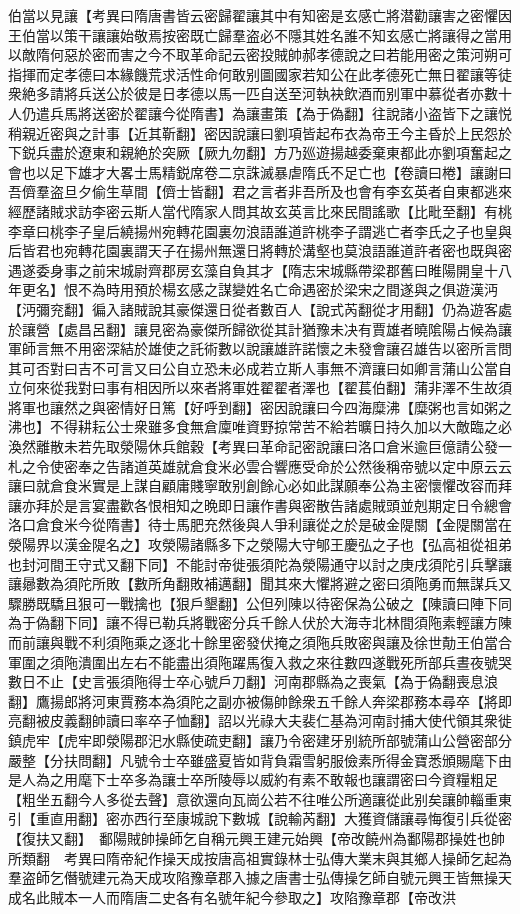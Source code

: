 伯當以見讓【考異曰隋唐書皆云密歸翟讓其中有知密是玄感亡將潜勸讓害之密懼因王伯當以策干讓讓始敬焉按密既亡歸羣盗必不隱其姓名誰不知玄感亡將讓得之當用以敵隋何惡於密而害之今不取革命記云密投賊帥郝孝德說之曰若能用密之策河朔可指揮而定孝德曰本緣饑荒求活性命何敢别圖國家若知公在此孝德死亡無日翟讓等徒衆絶多請將兵送公於彼是日孝德以馬一匹自送至河執袂飲酒而别軍中慕從者亦數十人仍遣兵馬將送密於翟讓今從隋書】為讓畫策【為于偽翻】往說諸小盗皆下之讓悦稍親近密與之計事【近其靳翻】密因說讓曰劉項皆起布衣為帝王今主昏於上民怨於下鋭兵盡於遼東和親絶於突厥【厥九勿翻】方乃廵遊揚越委棄東都此亦劉項奮起之會也以足下雄才大畧士馬精鋭席卷二京誅滅暴虐隋氏不足亡也【卷讀曰棬】讓謝曰吾儕羣盗旦夕偷生草間【儕士皆翻】君之言者非吾所及也會有李玄英者自東都逃來經歷諸賊求訪李密云斯人當代隋家人問其故玄英言比來民間謠歌【比毗至翻】有桃李章曰桃李子皇后繞揚州宛轉花園裏勿浪語誰道許桃李子謂逃亡者李氏之子也皇與后皆君也宛轉花園裏謂天子在揚州無還日將轉於溝壑也莫浪語誰道許者密也既與密遇遂委身事之前宋城尉齊郡房玄藻自負其才【隋志宋城縣帶梁郡舊曰睢陽開皇十八年更名】恨不為時用預於楊玄感之謀變姓名亡命遇密於梁宋之間遂與之俱遊漢沔【沔彌兖翻】徧入諸賊說其豪傑還日從者數百人【說式芮翻從才用翻】仍為遊客處於讓營【處昌呂翻】讓見密為豪傑所歸欲從其計猶豫未决有賈雄者曉隂陽占候為讓軍師言無不用密深結於雄使之託術數以說讓雄許諾懷之未發會讓召雄告以密所言問其可否對曰吉不可言又曰公自立恐未必成若立斯人事無不濟讓曰如卿言蒲山公當自立何來從我對曰事有相因所以來者將軍姓翟翟者澤也【翟萇伯翻】蒲非澤不生故須將軍也讓然之與密情好日篤【好呼到翻】密因說讓曰今四海糜沸【糜粥也言如粥之沸也】不得耕耘公士衆雖多食無倉廩唯資野掠常苦不給若曠日持久加以大敵臨之必渙然離散未若先取滎陽休兵館穀【考異曰革命記密說讓曰洛口倉米逾巨億請公發一札之令使密奉之告諸道英雄就倉食米必雲合響應受命於公然後稱帝號以定中原云云讓曰就倉食米實是上謀自顧庸賤寧敢别創餘心必如此謀願奉公為主密懷懼改容而拜讓亦拜於是言宴盡歡各恨相知之晩即日讓作書與密散告諸處賊頭並剋期定日令總會洛口倉食米今從隋書】待士馬肥充然後與人爭利讓從之於是破金隄關【金隄關當在滎陽界以漢金隄名之】攻滎陽諸縣多下之滎陽大守郇王慶弘之子也【弘高祖從祖弟也封河間王守式又翻下同】不能討帝徙張須陀為滎陽通守以討之庚戌須陀引兵擊讓讓曏數為須陀所敗【數所角翻敗補邁翻】聞其來大懼將避之密曰須陁勇而無謀兵又驟勝既驕且狠可一戰擒也【狠戶墾翻】公但列陳以待密保為公破之【陳讀曰陣下同為于偽翻下同】讓不得已勒兵將戰密分兵千餘人伏於大海寺北林間須陁素輕讓方陳而前讓與戰不利須陁乘之逐北十餘里密發伏掩之須陁兵敗密與讓及徐世勣王伯當合軍圍之須陁潰圍出左右不能盡出須陁躍馬復入救之來往數四遂戰死所部兵晝夜號哭數日不止【史言張須陁得士卒心號戶刀翻】河南郡縣為之喪氣【為于偽翻喪息浪翻】鷹揚郎將河東賈務本為須陀之副亦被傷帥餘衆五千餘人奔梁郡務本尋卒【將即亮翻被皮義翻帥讀曰率卒子恤翻】詔以光祿大夫裴仁基為河南討捕大使代領其衆徙鎮虎牢【虎牢即滎陽郡汜水縣使疏吏翻】讓乃令密建牙别統所部號蒲山公營密部分嚴整【分扶問翻】凡號令士卒雖盛夏皆如背負霜雪躬服儉素所得金寶悉頒賜麾下由是人為之用麾下士卒多為讓士卒所陵辱以威約有素不敢報也讓謂密曰今資糧粗足【粗坐五翻今人多從去聲】意欲還向瓦崗公若不往唯公所適讓從此别矣讓帥輜重東引【重直用翻】密亦西行至康城說下數城【說輸芮翻】大獲資儲讓尋悔復引兵從密【復扶又翻】　鄱陽賊帥操師乞自稱元興王建元始興【帝改饒州為鄱陽郡操姓也帥所類翻　考異曰隋帝紀作操天成按唐高祖實錄林士弘傳大業末與其鄉人操師乞起為羣盗師乞僭號建元為天成攻陷豫章郡入據之唐書士弘傳操乞師自號元興王皆無操天成名此賊本一人而隋唐二史各有名號年紀今參取之】攻陷豫章郡【帝改洪